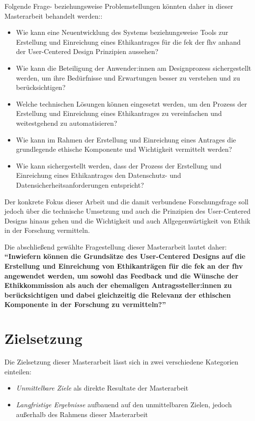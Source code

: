 \documentclass[a4paper,12pt,twoside]{scrreprt}
\begin{document}
Folgende Frage- beziehungsweise Problemstellungen könnten daher in dieser Masterarbeit behandelt werden::
\begin{itemize}
    \item Wie kann eine Neuentwicklung des Systems beziehungsweise Tools zur Erstellung und Einreichung eines Ethikantrages für die \acl{fek} der \acl{fhv} anhand der User-Centered Design Prinzipien aussehen?
    \item Wie kann die Beteiligung der Anwender:innen am Designprozess sichergestellt werden, um ihre Bedürfnisse und Erwartungen besser zu verstehen und zu berücksichtigen?
    \item Welche technischen Lösungen können eingesetzt werden, um den Prozess der Erstellung und Einreichung eines Ethikantrages zu vereinfachen und weitestgehend zu automatisieren?
    \item Wie kann im Rahmen der Erstellung und Einreichung eines Antrages die grundlegende ethische Komponente und Wichtigkeit vermittelt werden?
    \item Wie kann sichergestellt werden, dass der Prozess der Erstellung und Einreichung eines Ethikantrages den Datenschutz- und Datensicherheitsanforderungen entspricht?
\end{itemize}

\noindent Der konkrete Fokus dieser Arbeit und die damit verbundene Forschungsfrage soll jedoch über die technische Umsetzung und auch die Prinzipien des User-Centered Designs hinaus gehen und die Wichtigkeit und auch Allgegenwärtigkeit von Ethik in der Forschung vermitteln.

\clearpage

Die abschließend gewählte Fragestellung dieser Masterarbeit lautet daher: \textbf{\enquote{Inwiefern können die Grundsätze des User-Centered Designs auf die Erstellung und Einreichung von Ethikanträgen für die \acl{fek} an der \acl{fhv} angewendet werden, um sowohl das Feedback und die Wünsche der Ethikkommission als auch der ehemaligen Antragssteller:innen zu berücksichtigen und dabei gleichzeitig die Relevanz der ethischen Komponente in der Forschung zu vermitteln?}}

\section{Zielsetzung}
\label{sec:zielsetzung}

Die Zielsetzung dieser Masterarbeit lässt sich in zwei verschiedene Kategorien einteilen:
\begin{itemize}
    \item \textit{Unmittelbare Ziele} als direkte Resultate der Masterarbeit
    \item \textit{Langfristige Ergebnisse} aufbauend auf den unmittelbaren Zielen, jedoch außerhalb des Rahmens dieser Masterarbeit
\end{itemize}
\end{document}
